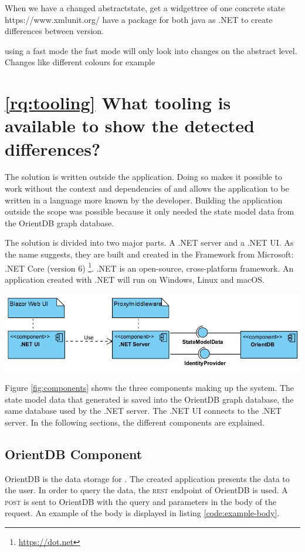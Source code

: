 When we have a changed abstractstate, get a widgettree of one concrete state
https://www.xmlunit.org/  have a package for both java as .NET to create differences between version.

using a fast mode
the fast mode will only look into changes on the abstract level. Changes like different colours for example




\section{\ref{rq:tooling} What tooling is available to show the detected differences?}

The solution is written outside the \testar application. Doing so makes it possible to work without the context and dependencies of \testar and allows the application to be written in a language more known by the developer. Building the application outside the \testar scope was possible because it only needed the state model data from the OrientDB graph database.

The solution is divided into two major parts. A \testar .NET server and a \testar .NET UI. As the name suggests, they are built and created in the Framework from Microsoft: .NET Core (version 6) \footnote{\url{https://dot.net}}. .NET is an open-source, cross-platform framework. An application created with .NET will run on Windows, Linux and macOS. 

\begingroup
\captionsetup{type=figure}
\includegraphics[scale=0.7]{thesis/images/server-ui-comp.png}
\label{fig:components}
\endgroup

Figure \ref{fig:components} shows the three components making up the system. The state model data that \testar generated is saved into the OrientDB graph database, the same database used by the .NET server. The .NET UI connects to the .NET server. In the following sections, the different components are explained. 

\subsection{OrientDB Component}
OrientDB is the data storage for \testar. The created application presents the data to the user. In order to query the data, the \textsc{rest} endpoint of OrientDB is used. A \textsc{post} is sent to OrientDB with the query and parameters in the body of the request. An example of the body is displayed in listing \ref{code:example-body}.

